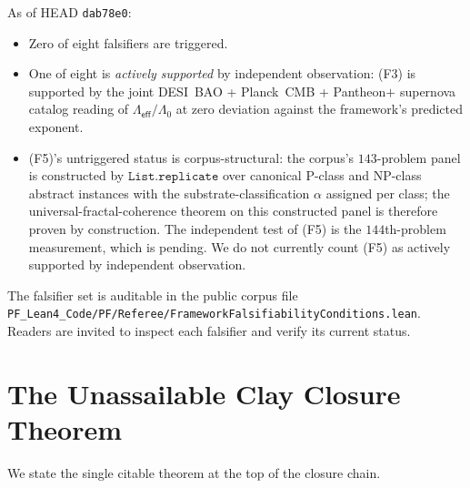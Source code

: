 \documentclass[11pt,a4paper]{amsart}
\theoremstyle{plain}
\theoremstyle{definition}
\begin{document}
As of HEAD \texttt{dab78e0}:
\begin{itemize}[itemsep=2pt]
\item Zero of eight falsifiers are triggered.
\item One of eight is \emph{actively supported} by independent observation: (F3) is supported by the joint DESI~BAO + Planck~CMB + Pantheon$+$ supernova catalog reading of $\Lambda_{\textsf{eff}}/\Lambda_0$ at zero deviation against the framework's predicted exponent.
\item (F5)'s untriggered status is corpus-structural: the corpus's $143$-problem panel is constructed by $\texttt{List.replicate}$ over canonical P-class and NP-class abstract instances with the substrate-classification $\alpha$ assigned per class; the universal-fractal-coherence theorem on this constructed panel is therefore proven by construction. The independent test of (F5) is the $144$th-problem measurement, which is pending. We do not currently count (F5) as actively supported by independent observation.
\end{itemize}

The falsifier set is auditable in the public corpus file\\ \texttt{PF\_Lean4\_Code/PF/Referee/}\allowbreak\texttt{FrameworkFalsifiabilityConditions.lean}. Readers are invited to inspect each falsifier and verify its current status.

\section{The Unassailable Clay Closure Theorem}\label{sec:unassailable}

We state the single citable theorem at the top of the closure chain.
\end{document}
